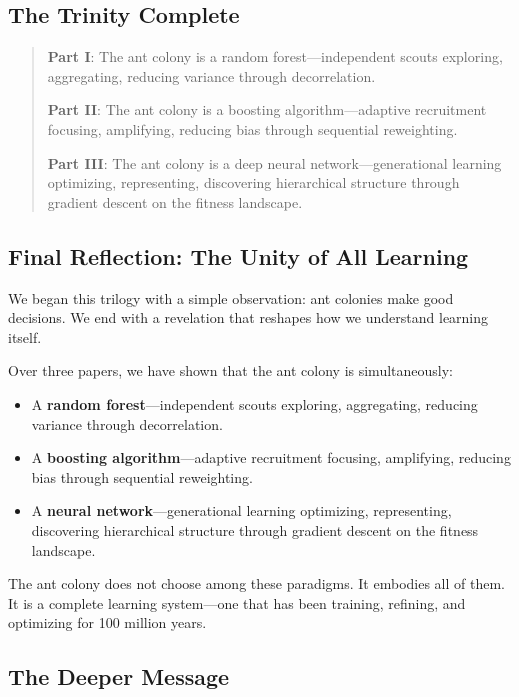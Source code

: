 \documentclass[12pt,letterpaper]{article}
\begin{document}
\subsection{The Trinity Complete}

\begin{quote}
\textbf{Part I}: The ant colony is a random forest—independent scouts exploring, aggregating, reducing variance through decorrelation.

\textbf{Part II}: The ant colony is a boosting algorithm—adaptive recruitment focusing, amplifying, reducing bias through sequential reweighting.

\textbf{Part III}: The ant colony is a deep neural network—generational learning optimizing, representing, discovering hierarchical structure through gradient descent on the fitness landscape.
\end{quote}

\subsection{Final Reflection: The Unity of All Learning}

We began this trilogy with a simple observation: ant colonies make good decisions. We end with a revelation that reshapes how we understand learning itself.

Over three papers, we have shown that the ant colony is simultaneously:

\begin{itemize}
    \item A \textbf{random forest}—independent scouts exploring, aggregating, reducing variance through decorrelation.
    \item A \textbf{boosting algorithm}—adaptive recruitment focusing, amplifying, reducing bias through sequential reweighting.
    \item A \textbf{neural network}—generational learning optimizing, representing, discovering hierarchical structure through gradient descent on the fitness landscape.
\end{itemize}

The ant colony does not choose among these paradigms. It embodies all of them. It is a complete learning system—one that has been training, refining, and optimizing for 100 million years.

\subsection*{The Deeper Message}
\end{document}
